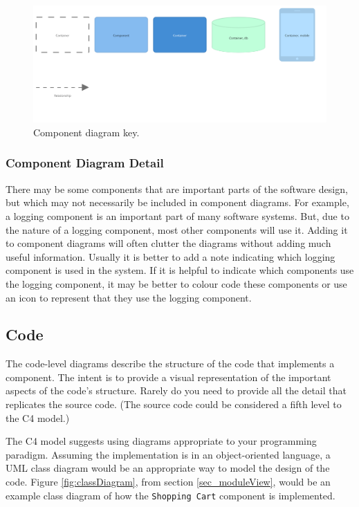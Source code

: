 \begin{figure}[h!]
    \centering
    \begin{adjustwidth}{-5mm}{-5mm}
        \includegraphics[trim=15 210 90 20,clip,width=0.92\paperwidth]{images/c4/component_diagram-key.png}
    \end{adjustwidth}
    \caption{Component diagram key.}
    \label{fig:c4_component_key}
\end{figure}

\subsubsection{Component Diagram Detail}
There may be some components that are important parts of the software design, but which may not necessarily be included in component diagrams.
For example, a logging component is an important part of many software systems.
But, due to the nature of a logging component, most other components will use it.
Adding it to component diagrams will often clutter the diagrams without adding much useful information.
Usually it is better to add a note indicating which logging component is used in the system.
If it is helpful to indicate which components use the logging component,
it may be better to colour code these components or use an icon to represent that they use the logging component.

\subsection{Code}
The code-level diagrams describe the structure of the code that implements a component.
The intent is to provide a visual representation of the important aspects of the code's structure.
Rarely do you need to provide all the detail that replicates the source code.
(The source code could be considered a fifth level to the C4 model.)

The C4 model suggests using diagrams appropriate to your programming paradigm.
Assuming the implementation is in an object-oriented language, a UML class diagram would be an appropriate way to model the design of the code.
Figure \ref{fig:classDiagram}, from section \ref{sec_moduleView},
would be an example class diagram of how the \texttt{Shopping Cart} component is implemented.

